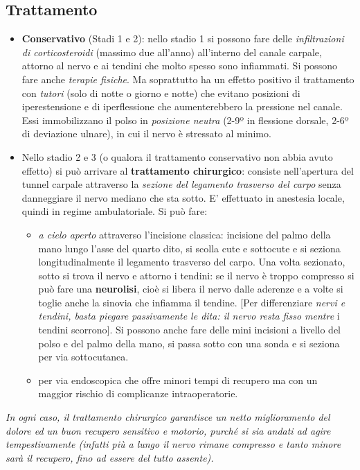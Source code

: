 \subsection{Trattamento}

\begin{itemize}
\item
  \textbf{Conservativo} (Stadi 1 e 2): nello stadio 1 si possono fare delle \emph{infiltrazioni di corticosteroidi} (massimo due all'anno) all'interno del canale carpale, attorno al nervo e ai tendini che molto spesso sono infiammati.
Si possono fare anche \emph{terapie fisiche}.
Ma soprattutto ha un effetto positivo il trattamento con \emph{tutori} (solo di notte o giorno e notte) che evitano posizioni di iperestensione e di iperflessione che aumenterebbero la pressione nel canale. Essi immobilizzano il polso in \emph{posizione neutra} (2-9º in flessione
dorsale, 2-6º di deviazione ulnare), in cui il nervo è stressato al minimo.
\item
  Nello stadio 2 e 3 (o qualora il trattamento conservativo non abbia avuto effetto) si può arrivare al \textbf{trattamento chirurgico}: consiste nell'apertura del tunnel carpale attraverso la \emph{sezione del legamento trasverso del carpo} senza danneggiare il nervo mediano che sta sotto. E' effettuato in anestesia locale, quindi in regime ambulatoriale.
Si può fare:
\begin{itemize}
\item
  \emph{a cielo aperto} attraverso l'incisione classica: incisione del palmo della mano lungo l'asse del quarto dito, si scolla cute e sottocute e si seziona longitudinalmente il legamento trasverso del carpo. Una volta sezionato, sotto si trova il nervo e attorno i tendini: se il nervo è troppo compresso si può fare una \textbf{neurolisi}, cioè si libera il nervo dalle aderenze e a volte si toglie anche la sinovia che infiamma il tendine.
{[}Per differenziare \emph{nervi e tendini, basta piegare passivamente le dita: il nervo resta fisso mentre} i tendini scorrono{]}.
Si possono anche fare delle mini incisioni a livello del polso e del palmo della mano, si passa sotto con una sonda e si seziona per via sottocutanea.
\item
  per via endoscopica che offre minori tempi di recupero ma con un maggior rischio di complicanze intraoperatorie.
\end{itemize}
\end{itemize}

\emph{In ogni caso, il trattamento chirurgico garantisce un netto miglioramento del dolore ed un buon recupero sensitivo e motorio, purché si sia andati ad agire tempestivamente (infatti più a lungo il nervo rimane compresso e tanto minore sarà il recupero, fino ad essere del tutto assente).}

